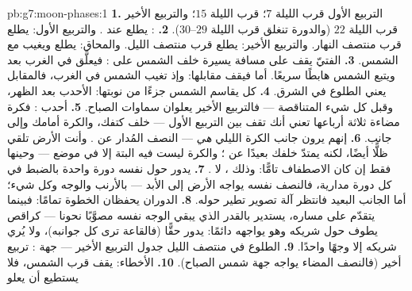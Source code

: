 \begin{solution}{pb:g7:moon-phases:1}
\textbf{1.} التربيع الأول قرب الليلة $7$؛  قرب الليلة
$15$؛ والتربيع الأخير قرب الليلة $22$ (والدورة تنغلق قرب
الليلة $29$--$30$).
\textbf{2.} : يطلع عند . والتربيع الأول: يطلع قرب
منتصف النهار. والتربيع الأخير: يطلع قرب منتصف الليل. والمحاق:
يطلع ويغيب مع الشمس.
\textbf{3.}  الفتيّ يقف على مسافة يسيرة خلف الشمس على
: فيعلَّق في الغرب بعد  ويتبع الشمس هابطًا سريعًا.
أما  فيقف مقابلها: وإذ تغيب الشمس في الغرب، فالمقابل يعني
الطلوع في الشرق.
\textbf{4.} كل  يقاسم الشمس جزءًا من نوبتها: الأحدب
 بعد الظهر، وقبل كل شيء  المتناقصة --- فالتربيع
الأخير   يعلوان سماوات الصباح.
\textbf{5.} أحدب : فكرة مضاءة ثلاثة أرباعها تعني أنك تقف
بين التربيع الأول  ---  خلف كتفك، والكرة أمامك
وإلى جانب.
\textbf{6.} إنهم يرون جانب الكرة الليلي \emph{هي} --- النصف
المُدار عن . وأنت الأرض تلقي ظلًّا أيضًا، لكنه يمتدّ
خلفك بعيدًا عن ؛ والكرة ليست فيه البتة إلا في موضع
 --- وحينها فقط إن كان الاصطفاف تامًّا: وذلك ، لا
.
\textbf{7.}  يدور حول نفسه دورة واحدة بالضبط في كل دورة
مدارية، فالنصف نفسه يواجه الأرض إلى الأبد --- بالأرنب والوجه
وكل شيء؛ أما الجانب البعيد فانتظر آلة تصوير تطير حوله.
\textbf{8.} الدوران  يحفظان الخطوة تمامًا: فبينما يتقدّم
 على مساره، يستدير بالقدر الذي يبقي الوجه نفسه مصوَّبًا
نحونا --- كراقص يطوف حول شريكه وهو يواجهه دائمًا: يدور حقًّا
(فالقاعة ترى كل جوانبه)، ولا يُري شريكه إلا وجهًا واحدًا.
\textbf{9.} الطلوع في منتصف الليل جدول التربيع الأخير --- جهة
: تربيع أخير (فالنصف المضاء يواجه جهة شمس الصباح).
\textbf{10.} الأخطاء:  يقف قرب الشمس، فلا يستطيع أن يعلو

\end{solution}
